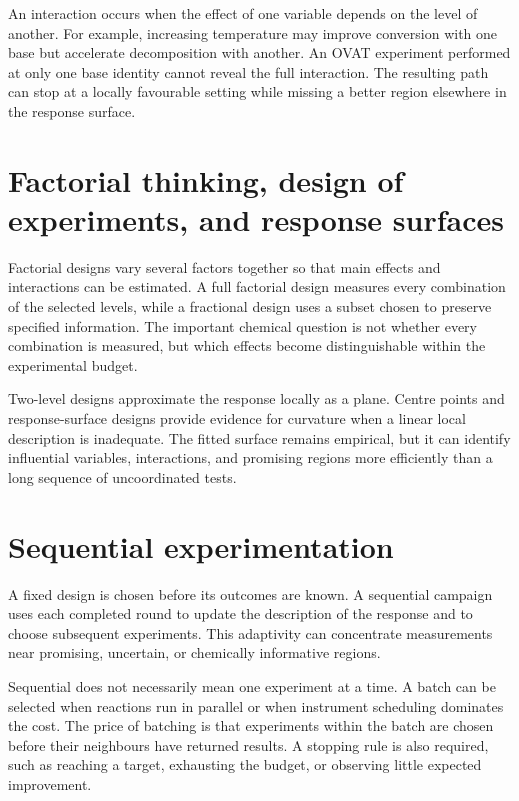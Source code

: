 An interaction occurs when the effect of one variable depends on the level of another.
For example, increasing temperature may improve conversion with one base but accelerate decomposition with another.
An OVAT experiment performed at only one base identity cannot reveal the full interaction.
The resulting path can stop at a locally favourable setting while missing a better region elsewhere in the response surface.

\section{Factorial thinking, design of experiments, and response surfaces}

Factorial designs vary several factors together so that main effects and interactions can be estimated.
A full factorial design measures every combination of the selected levels, while a fractional design uses a subset chosen to preserve specified information.
The important chemical question is not whether every combination is measured, but which effects become distinguishable within the experimental budget.

Two-level designs approximate the response locally as a plane.
Centre points and response-surface designs provide evidence for curvature when a linear local description is inadequate.
The fitted surface remains empirical, but it can identify influential variables, interactions, and promising regions more efficiently than a long sequence of uncoordinated tests.

\section{Sequential experimentation}

A fixed design is chosen before its outcomes are known.
A sequential campaign uses each completed round to update the description of the response and to choose subsequent experiments.
This adaptivity can concentrate measurements near promising, uncertain, or chemically informative regions.

Sequential does not necessarily mean one experiment at a time.
A batch can be selected when reactions run in parallel or when instrument scheduling dominates the cost.
The price of batching is that experiments within the batch are chosen before their neighbours have returned results.
A stopping rule is also required, such as reaching a target, exhausting the budget, or observing little expected improvement.

